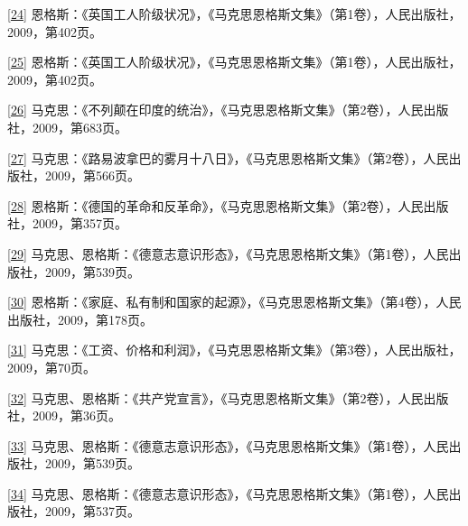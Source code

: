 \documentclass[UTF8, fontset = sourcesans, a4paper, oneside, zihao =
-4, scheme=chinese, no-math, space=true]{ctexbook}
\begin{document}
\protect\hypertarget{part0010_split_002.htmlux5cux23m24}{}{}\protect\hyperlink{part0010_split_002.htmlux5cux23w24}{{[}24{]}}
恩格斯：《英国工人阶级状况》，《马克思恩格斯文集》（第1卷），人民出版社，2009，第402页。

\protect\hypertarget{part0010_split_002.htmlux5cux23m25}{}{}\protect\hyperlink{part0010_split_002.htmlux5cux23w25}{{[}25{]}}
恩格斯：《英国工人阶级状况》，《马克思恩格斯文集》（第1卷），人民出版社，2009，第402页。

\protect\hypertarget{part0010_split_002.htmlux5cux23m26}{}{}\protect\hyperlink{part0010_split_002.htmlux5cux23w26}{{[}26{]}}
马克思：《不列颠在印度的统治》，《马克思恩格斯文集》（第2卷），人民出版社，2009，第683页。

\protect\hypertarget{part0010_split_002.htmlux5cux23m27}{}{}\protect\hyperlink{part0010_split_002.htmlux5cux23w27}{{[}27{]}}
马克思：《路易波拿巴的雾月十八日》，《马克思恩格斯文集》（第2卷），人民出版社，2009，第566页。

\protect\hypertarget{part0010_split_002.htmlux5cux23m28}{}{}\protect\hyperlink{part0010_split_002.htmlux5cux23w28}{{[}28{]}}
恩格斯：《德国的革命和反革命》，《马克思恩格斯文集》（第2卷），人民出版社，2009，第357页。

\protect\hypertarget{part0010_split_002.htmlux5cux23m29}{}{}\protect\hyperlink{part0010_split_002.htmlux5cux23w29}{{[}29{]}}
马克思、恩格斯：《德意志意识形态》，《马克思恩格斯文集》（第1卷），人民出版社，2009，第539页。

\protect\hypertarget{part0010_split_002.htmlux5cux23m30}{}{}\protect\hyperlink{part0010_split_002.htmlux5cux23w30}{{[}30{]}}
恩格斯：《家庭、私有制和国家的起源》，《马克思恩格斯文集》（第4卷），人民出版社，2009，第178页。

\protect\hypertarget{part0010_split_002.htmlux5cux23m31}{}{}\protect\hyperlink{part0010_split_002.htmlux5cux23w31}{{[}31{]}}
马克思：《工资、价格和利润》，《马克思恩格斯文集》（第3卷），人民出版社，2009，第70页。

\protect\hypertarget{part0010_split_002.htmlux5cux23m32}{}{}\protect\hyperlink{part0010_split_002.htmlux5cux23w32}{{[}32{]}}
马克思、恩格斯：《共产党宣言》，《马克思恩格斯文集》（第2卷），人民出版社，2009，第36页。

\protect\hypertarget{part0010_split_002.htmlux5cux23m33}{}{}\protect\hyperlink{part0010_split_002.htmlux5cux23w33}{{[}33{]}}
马克思、恩格斯：《德意志意识形态》，《马克思恩格斯文集》（第1卷），人民出版社，2009，第539页。

\protect\hypertarget{part0010_split_002.htmlux5cux23m34}{}{}\protect\hyperlink{part0010_split_002.htmlux5cux23w34}{{[}34{]}}
马克思、恩格斯：《德意志意识形态》，《马克思恩格斯文集》（第1卷），人民出版社，2009，第537页。
\end{document}
